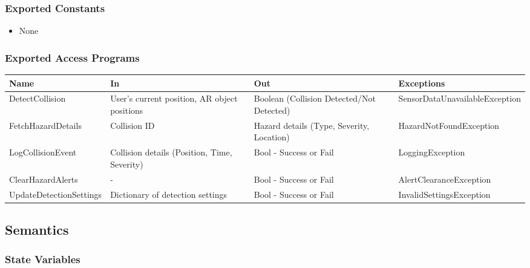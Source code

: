 \documentclass[12pt, titlepage]{article}
\begin{document}
\subsubsection{Exported Constants}

\begin{itemize}
  \item None
\end{itemize}

\subsubsection{Exported Access Programs}

\begin{center}
  \begin{tabular}{p{4.2cm} p{3cm} p{3cm} p{4cm}}
    \hline
    \textbf{Name}           & \textbf{In}                                  & \textbf{Out}                              & \textbf{Exceptions}            \\
    \hline
    DetectCollision         & User’s current position, AR object positions & Boolean (Collision Detected/Not Detected) & SensorDataUnavailableException \\
    \hline
    FetchHazardDetails      & Collision ID                                 & Hazard details (Type, Severity, Location) & HazardNotFoundException        \\
    \hline
    LogCollisionEvent       & Collision details (Position, Time, Severity) & Bool - Success or Fail                    & LoggingException               \\
    \hline
    ClearHazardAlerts       & -                                            & Bool - Success or Fail                    & AlertClearanceException        \\
    \hline
    UpdateDetectionSettings & Dictionary of detection settings             & Bool - Success or Fail                    & InvalidSettingsException       \\
    \hline
  \end{tabular}
\end{center}


\subsection{Semantics}

\subsubsection{State Variables}
\end{document}
